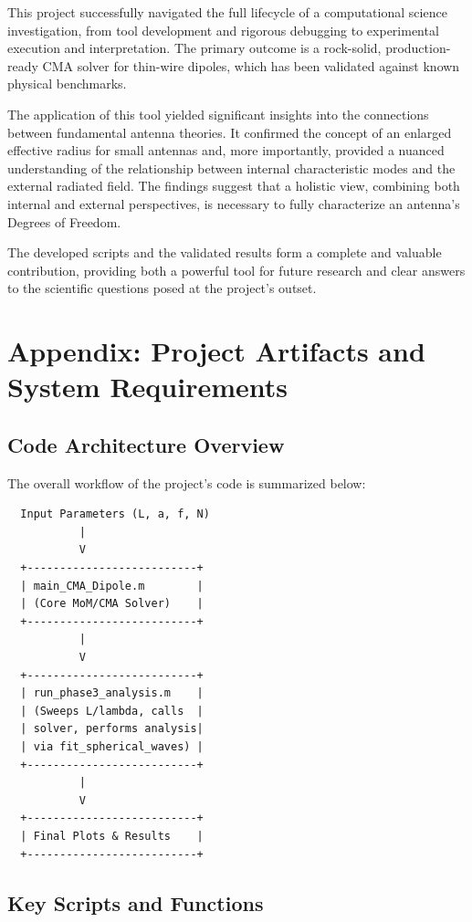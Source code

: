 \documentclass[11pt, a4paper]{article}
\begin{document}
This project successfully navigated the full lifecycle of a computational science investigation, from tool development and rigorous debugging to experimental execution and interpretation. The primary outcome is a rock-solid, production-ready CMA solver for thin-wire dipoles, which has been validated against known physical benchmarks.

The application of this tool yielded significant insights into the connections between fundamental antenna theories. It confirmed the concept of an enlarged effective radius for small antennas and, more importantly, provided a nuanced understanding of the relationship between internal characteristic modes and the external radiated field. The findings suggest that a holistic view, combining both internal and external perspectives, is necessary to fully characterize an antenna's Degrees of Freedom.

The developed scripts and the validated results form a complete and valuable contribution, providing both a powerful tool for future research and clear answers to the scientific questions posed at the project's outset.

\newpage

\appendix
\section{Appendix: Project Artifacts and System Requirements}

\subsection{Code Architecture Overview}
The overall workflow of the project's code is summarized below:
\begin{verbatim}
  Input Parameters (L, a, f, N)
           |
           V
  +--------------------------+
  | main_CMA_Dipole.m        |
  | (Core MoM/CMA Solver)    |
  +--------------------------+
           |
           V
  +--------------------------+
  | run_phase3_analysis.m    |
  | (Sweeps L/lambda, calls  |
  | solver, performs analysis|
  | via fit_spherical_waves) |
  +--------------------------+
           |
           V
  +--------------------------+
  | Final Plots & Results    |
  +--------------------------+
\end{verbatim}

\subsection{Key Scripts and Functions}
\end{document}
